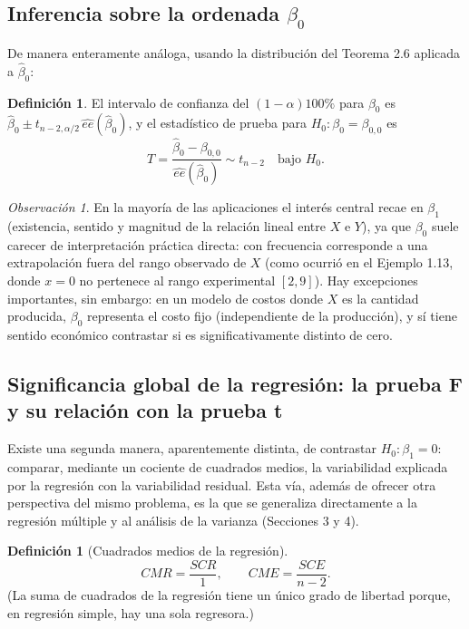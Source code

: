 \documentclass[11pt,a4paper]{article}
\theoremstyle{plain}
\theoremstyle{definition}
\newtheorem{definicion}[teorema]{Definición}
\theoremstyle{remark}
\newtheorem{observacion}[teorema]{Observación}
\begin{document}
\subsection{Inferencia sobre la ordenada \texorpdfstring{$\beta_0$}{beta0}}

De manera enteramente análoga, usando la distribución del Teorema 2.6 aplicada a $\hat\beta_0$:

\begin{definicion}
El intervalo de confianza del $(1-\alpha)100\%$ para $\beta_0$ es $\hat\beta_0\pm t_{n-2,\alpha/2}\,\widehat{ee}(\hat\beta_0)$, y el estadístico de prueba para $H_0:\beta_0=\beta_{0,0}$ es
\[
T = \frac{\hat\beta_0-\beta_{0,0}}{\widehat{ee}(\hat\beta_0)} \sim t_{n-2} \quad \text{bajo } H_0.
\]
\end{definicion}

\begin{observacion}
En la mayoría de las aplicaciones el interés central recae en $\beta_1$ (existencia, sentido y magnitud de la relación lineal entre $X$ e $Y$), ya que $\beta_0$ suele carecer de interpretación práctica directa: con frecuencia corresponde a una extrapolación fuera del rango observado de $X$ (como ocurrió en el Ejemplo 1.13, donde $x=0$ no pertenece al rango experimental $[2,9]$). Hay excepciones importantes, sin embargo: en un modelo de costos donde $X$ es la cantidad producida, $\beta_0$ representa el costo fijo (independiente de la producción), y sí tiene sentido económico contrastar si es significativamente distinto de cero.
\end{observacion}

\subsection{Significancia global de la regresión: la prueba F y su relación con la prueba t}

Existe una segunda manera, aparentemente distinta, de contrastar $H_0:\beta_1=0$: comparar, mediante un cociente de cuadrados medios, la variabilidad explicada por la regresión con la variabilidad residual. Esta vía, además de ofrecer otra perspectiva del mismo problema, es la que se generaliza directamente a la regresión múltiple y al análisis de la varianza (Secciones 3 y 4).

\begin{definicion}[Cuadrados medios de la regresión]
\[
CMR = \frac{SCR}{1}, \qquad CME = \frac{SCE}{n-2}.
\]
(La suma de cuadrados de la regresión tiene un único grado de libertad porque, en regresión simple, hay una sola regresora.)
\end{definicion}
\end{document}
